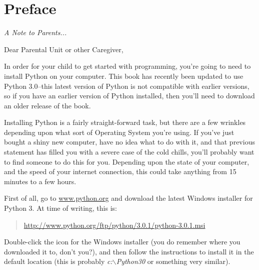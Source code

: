 

\chapter*{Preface}\normalsize
\begin{center}
{\em A Note to Parents...}
\end{center}
\pagestyle{plain}

\noindent
Dear Parental Unit or other Caregiver,

In order for your child to get started with programming, you're going to need to install Python on your computer.  This book has recently been updated to use Python 3.0--this latest version of Python is not compatible with earlier versions, so if you have an earlier version of Python installed, then you'll need to download an older release of the book.

Installing Python is a fairly straight-forward task, but there are a few wrinkles depending upon what sort of Operating System you're using.  If you've just bought a shiny new computer, have no idea what to do with it, and that previous statement has filled you with a severe case of the cold chills, you'll probably want to find someone to do this for you.  Depending upon the state of your computer, and the speed of your internet connection, this could take anything from 15 minutes to a few hours.

\begin{WINDOWS}

\noindent
First of all, go to \href{http://www.python.org}{www.python.org} and download the latest Windows installer for Python 3.  At time of writing, this is:
\begin{quote}
     \href{http://www.python.org/ftp/python/3.0.1/python-3.0.1.msi}{http://www.python.org/ftp/python/3.0.1/python-3.0.1.msi}
\end{quote}
Double-click the icon for the Windows installer (you do remember where you downloaded it to, don't you?), and then follow the instructions to install it in the default location (this is probably \emph{c:$\backslash$Python30} or something very similar).

\end{WINDOWS}

